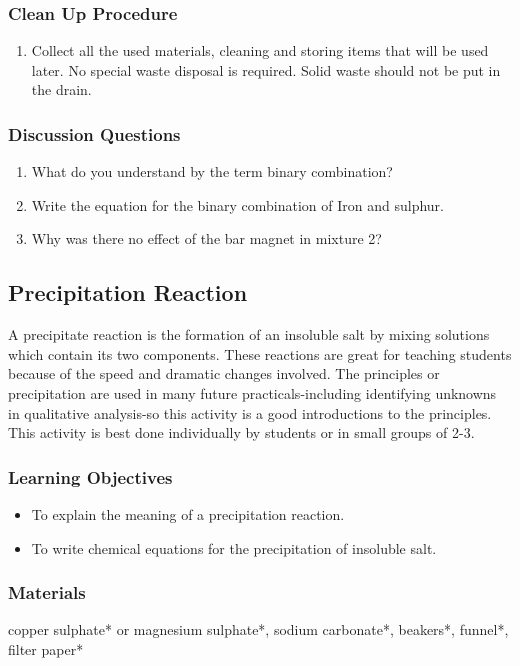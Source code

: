 \subsubsection*{Clean Up Procedure}
\begin{enumerate}
\item{Collect all the used materials, cleaning and storing items that will be used later. No special waste disposal is required. Solid waste should not be put in the drain.}
\end{enumerate}

\subsubsection*{Discussion Questions}
\begin{enumerate}
\item{What do you understand by the term binary combination?}
\item{Write the equation for the binary combination of Iron and sulphur.}
\item{Why was there no effect of the bar magnet in mixture 2?}
\end{enumerate}

\subsection{Precipitation Reaction}
A precipitate reaction is the formation of an insoluble salt by mixing solutions which contain its two components. These reactions are great for teaching students because of the speed and dramatic changes involved. The principles or precipitation are used in many future practicals-including identifying unknowns in qualitative analysis-so this activity is a good introductions to the principles. This activity is best done individually by students or in small groups of 2-3. 

\subsubsection*{Learning Objectives}
\begin{itemize}
\item{To explain the meaning of a precipitation reaction.}
\item{To write chemical equations for the precipitation of insoluble salt.}
\end{itemize}

\subsubsection*{Materials}
copper sulphate* or magnesium sulphate*, sodium carbonate*, beakers*, funnel*, filter paper*

